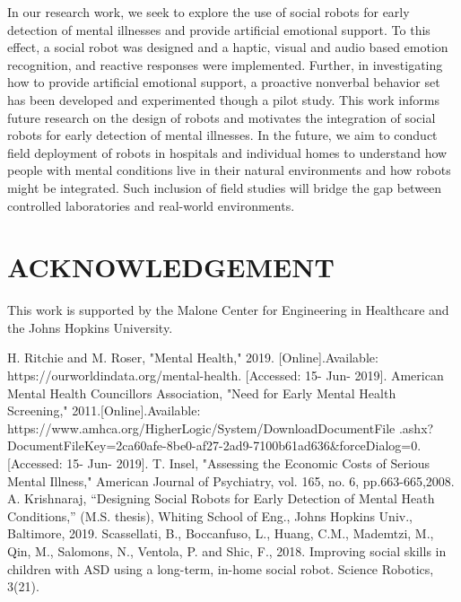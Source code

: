 \documentclass[letterpaper, 10 pt, conference]{ieeeconf}  %
\begin{document}
In our research work, we seek to explore the use of social robots for early detection of mental illnesses and provide artificial emotional support. To this effect, a social robot was designed and a haptic, visual and audio based emotion recognition, and reactive responses were implemented. Further, in investigating how to provide artificial emotional support, a proactive nonverbal behavior set has been developed and experimented though a pilot study. This work informs future research on the design of robots and motivates the integration of social robots for early detection of mental illnesses. In the future, we aim to conduct field deployment of robots in hospitals and individual homes to understand how people with mental conditions live in their natural environments and how robots might be integrated. Such inclusion of field studies will bridge the gap between controlled laboratories and real-world environments. 

\section{ACKNOWLEDGEMENT}
This work is supported by the Malone Center for Engineering in Healthcare and the Johns Hopkins University.


\begin{thebibliography}{99} %

 H. Ritchie and M. Roser, "Mental Health," 2019. [Online].Available: https://ourworldindata.org/mental-health. [Accessed: 15- Jun- 2019]. 
 American Mental Health Councillors Association, "Need for Early Mental Health Screening," 2011.[Online].Available: https://www.amhca.org/HigherLogic/System/DownloadDocumentFile .ashx?DocumentFileKey=2ca60afe-8be0-af27-2ad9-7100b61ad636&forceDialog=0. [Accessed: 15- Jun- 2019]. 
 T. Insel, "Assessing the Economic Costs of Serious Mental Illness," American Journal of Psychiatry, vol. 165, no. 6, pp.663-665,2008.
 A. Krishnaraj, “Designing Social Robots for Early Detection of Mental Heath Conditions,” (M.S. thesis), Whiting School of Eng., Johns Hopkins Univ., Baltimore, 2019.
 Scassellati, B., Boccanfuso, L., Huang, C.M., Mademtzi, M., Qin, M., Salomons, N., Ventola, P. and Shic, F., 2018. Improving social skills in children with ASD using a long-term, in-home social robot. Science Robotics, 3(21).

\end{thebibliography}
\end{document}
